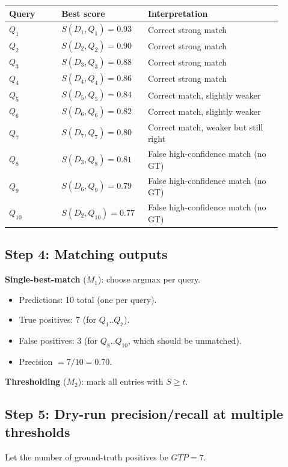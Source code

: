 \documentclass[11pt]{article}
\begin{document}
\begin{longtable}{p{0.18\linewidth} p{0.26\linewidth} p{0.46\linewidth}}
\toprule
\textbf{Query} & \textbf{Best score} & \textbf{Interpretation} \\
\midrule
$Q_1$ & $S(D_1,Q_1)=0.93$ & Correct strong match \\
$Q_2$ & $S(D_2,Q_2)=0.90$ & Correct strong match \\
$Q_3$ & $S(D_3,Q_3)=0.88$ & Correct strong match \\
$Q_4$ & $S(D_4,Q_4)=0.86$ & Correct strong match \\
$Q_5$ & $S(D_5,Q_5)=0.84$ & Correct match, slightly weaker \\
$Q_6$ & $S(D_6,Q_6)=0.82$ & Correct match, slightly weaker \\
$Q_7$ & $S(D_7,Q_7)=0.80$ & Correct match, weaker but still right \\
$Q_8$ & $S(D_3,Q_8)=0.81$ & False high-confidence match (no GT) \\
$Q_9$ & $S(D_6,Q_9)=0.79$ & False high-confidence match (no GT) \\
$Q_{10}$ & $S(D_2,Q_{10})=0.77$ & False high-confidence match (no GT) \\
\bottomrule
\end{longtable}

\subsection{Step 4: Matching outputs}
\textbf{Single-best-match} ($M_1$): choose argmax per query.

\begin{itemize}[leftmargin=*]
  \item Predictions: 10 total (one per query).
  \item True positives: 7 (for $Q_1$..$Q_7$).
  \item False positives: 3 (for $Q_8$..$Q_{10}$, which should be unmatched).
  \item Precision $=7/10=0.70$.
\end{itemize}

\textbf{Thresholding} ($M_2$): mark all entries with $S \ge t$.

\subsection{Step 5: Dry-run precision/recall at multiple thresholds}
Let the number of ground-truth positives be $GTP=7$.
\end{document}
